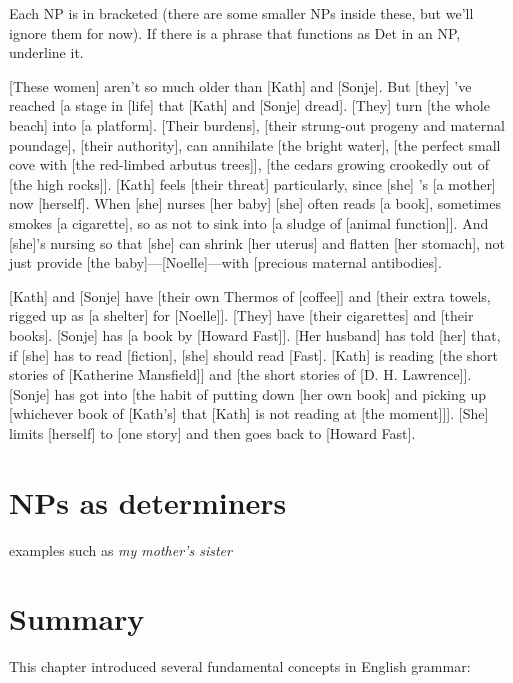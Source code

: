\begin{tcolorbox}[title=From ``The love of a good woman'' by Alice Munro, colback=white]

Each NP is in bracketed (there are some smaller NPs inside these, but we'll ignore them for now). If there is a phrase that functions as Det in an NP, underline it.

\phantom{a}

    [These women] aren't so much older than [Kath] and [Sonje]. But [they] 've reached [a stage in [life] that [Kath] and [Sonje] dread]. [They] turn [the whole beach] into [a platform]. [Their burdens], [their strung-out progeny and maternal poundage], [their authority], can annihilate [the bright water], [the perfect small cove with [the red-limbed arbutus trees]], [the cedars growing crookedly out of [the high rocks]]. [Kath] feels [their threat] particularly, since [she] 's [a mother] now [herself]. When [she] nurses [her baby] [she] often reads [a book], sometimes smokes [a cigarette], so as not to sink into [a sludge of [animal function]]. And [she]'s nursing so that [she] can shrink [her uterus] and flatten [her stomach], not just provide [the baby]---[Noelle]---with [precious maternal antibodies].

    \phantom{xxx}[Kath] and [Sonje] have [their own Thermos of [coffee]] and [their extra towels, rigged up as [a shelter] for [Noelle]]. [They] have [their cigarettes] and [their books]. [Sonje] has [a book by [Howard Fast]]. [Her husband] has told [her] that, if [she] has to read [fiction], [she] should read [Fast]. [Kath] is reading [the short stories of [Katherine Mansfield]] and [the short stories of [D. H. Lawrence]]. [Sonje] has got into [the habit of putting down [her own book] and picking up [whichever book of [Kath's] that [Kath] is not reading at [the moment]]]. [She] limits [herself] to [one story] and then goes back to [Howard Fast].
\end{tcolorbox}

\section{NPs as determiners}

examples such as \textit{my mother's sister}

\section{Summary}

This chapter introduced several fundamental concepts in English grammar:

